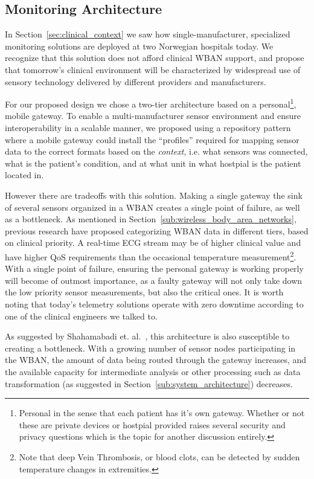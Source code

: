 \subsection{Monitoring Architecture} %
\label{sub:monitoring_architecture}

In Section~\ref{sec:clinical_context} we saw how single-manufacturer, specialized monitoring solutions are deployed at two Norwegian hospitals today. We recognize that this solution does not afford clinical WBAN support, and propose that tomorrow's clinical environment will be characterized by widespread use of sensory technology delivered by different providers and manufacturers.

For our proposed design we chose a two-tier architecture based on a personal\footnote{ Personal in the sense that each patient has it's own gateway. Whether or not these are private devices or hostpial provided raises several security and privacy questions which is the topic for another discussion entirely.}, mobile gateway. To enable a multi-manufacturer sensor environment and ensure interoperability in a scalable manner, we proposed using a repository pattern where a mobile gateway could install the ``profiles'' required for mapping sensor data to the correct formats based on the \emph{context}, i.e. what sensors was connected, what is the patient's condition, and at what unit in what hostpial is the patient located in. 

However there are tradeoffs with this solution. Making a single gateway the sink of several sensors organized in a WBAN creates a single point of failure, as well as a bottleneck. As mentioned in Section~\ref{sub:wireless_body_area_networks}, previous research have proposed categorizing WBAN data in different tiers, based on clinical priority. A real-time ECG stream may be of higher clinical value and have higher QoS requirements than the occasional temperature measurement\footnote{ Note that deep Vein Thrombosis, or blood clots, can be detected by sudden temperature changes in extremities.}.  With a single point of failure, ensuring the personal gateway is working properly will become of outmost importance, as a faulty gateway will not only take down the low priority sensor measurements, but also the critical ones. It is worth noting that today's telemetry solutions operate with zero downtime according to one of the clinical engineers we talked to.

As suggested by Shahamabadi et. al.~\cite{Shahamabadi:2013df}, this architecture is also susceptible to creating a bottleneck. With a growing number of sensor nodes participating in the WBAN, the amount of data being routed through the gateway increases, and the available capacity for intermediate analysis or other processing such as data transformation (as suggested in Section~\ref{sub:system_architecture}) decreases. 

